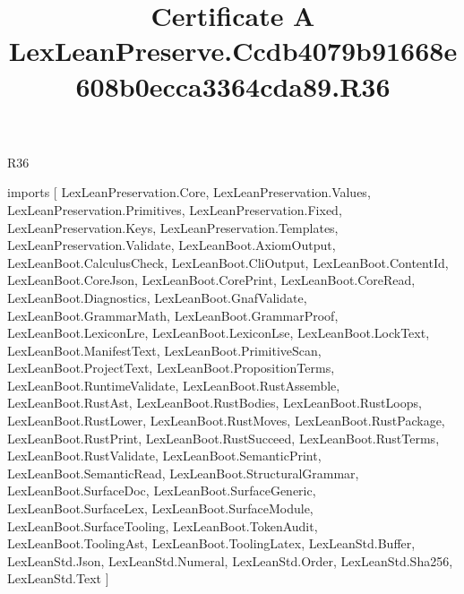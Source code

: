 \begin{lexlean}{R36}
\title{Certificate A LexLeanPreserve.Ccdb4079b91668e608b0ecca3364cda89.R36}
\begin{coremodule}
imports [
  LexLeanPreservation.Core,
  LexLeanPreservation.Values,
  LexLeanPreservation.Primitives,
  LexLeanPreservation.Fixed,
  LexLeanPreservation.Keys,
  LexLeanPreservation.Templates,
  LexLeanPreservation.Validate,
  LexLeanBoot.AxiomOutput,
  LexLeanBoot.CalculusCheck,
  LexLeanBoot.CliOutput,
  LexLeanBoot.ContentId,
  LexLeanBoot.CoreJson,
  LexLeanBoot.CorePrint,
  LexLeanBoot.CoreRead,
  LexLeanBoot.Diagnostics,
  LexLeanBoot.GnafValidate,
  LexLeanBoot.GrammarMath,
  LexLeanBoot.GrammarProof,
  LexLeanBoot.LexiconLre,
  LexLeanBoot.LexiconLse,
  LexLeanBoot.LockText,
  LexLeanBoot.ManifestText,
  LexLeanBoot.PrimitiveScan,
  LexLeanBoot.ProjectText,
  LexLeanBoot.PropositionTerms,
  LexLeanBoot.RuntimeValidate,
  LexLeanBoot.RustAssemble,
  LexLeanBoot.RustAst,
  LexLeanBoot.RustBodies,
  LexLeanBoot.RustLoops,
  LexLeanBoot.RustLower,
  LexLeanBoot.RustMoves,
  LexLeanBoot.RustPackage,
  LexLeanBoot.RustPrint,
  LexLeanBoot.RustSucceed,
  LexLeanBoot.RustTerms,
  LexLeanBoot.RustValidate,
  LexLeanBoot.SemanticPrint,
  LexLeanBoot.SemanticRead,
  LexLeanBoot.StructuralGrammar,
  LexLeanBoot.SurfaceDoc,
  LexLeanBoot.SurfaceGeneric,
  LexLeanBoot.SurfaceLex,
  LexLeanBoot.SurfaceModule,
  LexLeanBoot.SurfaceTooling,
  LexLeanBoot.TokenAudit,
  LexLeanBoot.ToolingAst,
  LexLeanBoot.ToolingLatex,
  LexLeanStd.Buffer,
  LexLeanStd.Json,
  LexLeanStd.Numeral,
  LexLeanStd.Order,
  LexLeanStd.Sha256,
  LexLeanStd.Text
]


\end{coremodule}
\end{lexlean}

